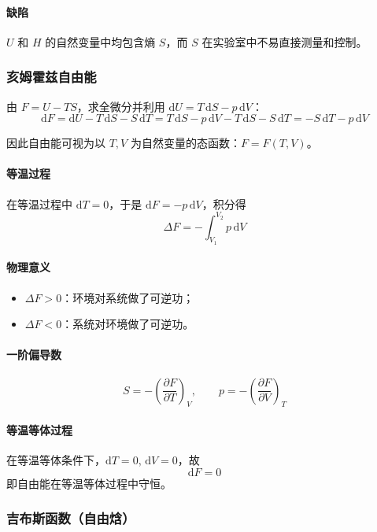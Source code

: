 \documentclass[UTF8]{ctexart}
\begin{document}
\paragraph{缺陷}
$U$ 和 $H$ 的自然变量中均包含熵 $S$，而 $S$ 在实验室中不易直接测量和控制。

\subsubsection{亥姆霍兹自由能}

由 $F=U-TS$，求全微分并利用 $\mathrm{d}U=T\,\mathrm{d}S-p\,\mathrm{d}V$：
\[
\mathrm{d}F=\mathrm{d}U-T\,\mathrm{d}S-S\,\mathrm{d}T
=T\,\mathrm{d}S-p\,\mathrm{d}V-T\,\mathrm{d}S-S\,\mathrm{d}T
=-S\,\mathrm{d}T-p\,\mathrm{d}V
\]

因此自由能可视为以 $T,V$ 为自然变量的态函数：$F=F(T,V)$。

\paragraph{等温过程}
在等温过程中 $\mathrm{d}T=0$，于是 $\mathrm{d}F=-p\,\mathrm{d}V$，积分得
\[
\Delta F=-\int_{V_1}^{V_2}p\,\mathrm{d}V
\]

\paragraph{物理意义}
\begin{itemize}[leftmargin=2em]
  \item $\Delta F>0$：环境对系统做了可逆功；
  \item $\Delta F<0$：系统对环境做了可逆功。
\end{itemize}

\paragraph{一阶偏导数}
\[
S=-\left(\frac{\partial F}{\partial T}\right)_V,\qquad
p=-\left(\frac{\partial F}{\partial V}\right)_T
\]

\paragraph{等温等体过程}
在等温等体条件下，$\mathrm{d}T=0,\,\mathrm{d}V=0$，故
\[
\boxed{\mathrm{d}F=0}
\]
即自由能在等温等体过程中守恒。

\subsubsection{吉布斯函数（自由焓）}
\end{document}
